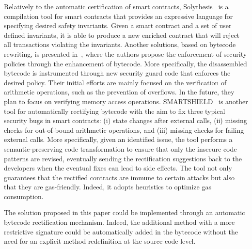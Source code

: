 Relatively to the automatic certification of smart contracts,
Solythesis~\cite{solythesis_solidity_validation} is a compilation tool for smart contracts
that provides an expressive language for specifying desired safety invariants.
Given a smart contract and a set of user defined invariants,
it is able to produce a new enriched contract that will reject all transactions
violating the invariants.
%
Another solutions, based on bytecode rewriting, is presented in~\cite{bytecode_rewriting},
where the authors propose the enforcement of security policies through the enhancement of bytecode.
More specifically, the disassembled bytecode is instrumented through new security guard code
that enforces the desired policy. Their initial efforts are mainly focused on the verification
of arithmetic operations, such as the prevention of overflows. In the future, they plan to focus on
verifying memory access operations.
%
SMARTSHIELD~\cite{smartshield} is another tool for automatically
rectifying bytecode with the aim to fix three typical security bugs in smart contracts:
(i) state changes after external calls, (ii) missing checks for out-of-bound arithmetic operations,
and (iii) missing checks for failing external calls. More specifically, given an identified issue,
the tool performs a semantic-preserving code transformation to ensure that only the insecure code
patterns are revised, eventually sending the rectification suggestions back to the developers
when the eventual fixes can lead to side effects. The tool not only guarantees that the rectified
contracts are immune to certain attacks but also that they are gas-friendly.
Indeed, it adopts heuristics to optimize gas consumption. 

The solution proposed in this paper could be implemented through an automatic bytecode rectification mechanism. Indeed, the additional method with a more restrictive signature could be automatically added in the bytecode without the need for an explicit method redefinition at the source code level.


